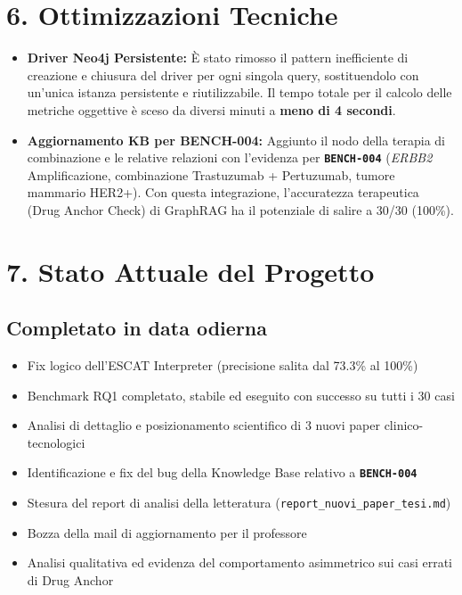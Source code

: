 \documentclass[12pt, a4paper]{article}
\newcommand{\pass}[1]{{\color{passgreen}\textbf{#1}}}
\newcommand{\bench}[1]{{\texttt{\textbf{#1}}}}
\begin{document}
\section*{6. Ottimizzazioni Tecniche}
\begin{itemize}[leftmargin=1.5em, itemsep=3pt]
  \item \textbf{Driver Neo4j Persistente:} È stato rimosso il pattern inefficiente di creazione e chiusura del driver per ogni singola query, sostituendolo con un'unica istanza persistente e riutilizzabile. Il tempo totale per il calcolo delle metriche oggettive è sceso da diversi minuti a \pass{meno di 4 secondi}.
  \item \textbf{Aggiornamento KB per BENCH-004:} Aggiunto il nodo della terapia di combinazione e le relative relazioni con l'evidenza per \bench{BENCH-004} (\textit{ERBB2} Amplificazione, combinazione Trastuzumab + Pertuzumab, tumore mammario HER2+). Con questa integrazione, l'accuratezza terapeutica (Drug Anchor Check) di GraphRAG ha il potenziale di salire a 30/30 (100\%).
\end{itemize}

\section*{7. Stato Attuale del Progetto}

\subsection*{Completato in data odierna}
\begin{itemize}[leftmargin=1.8em, itemsep=2pt, label=\pass{[\textsf{x}]}]
  \item Fix logico dell'ESCAT Interpreter (precisione salita dal 73.3\% al 100\%)
  \item Benchmark RQ1 completato, stabile ed eseguito con successo su tutti i 30 casi
  \item Analisi di dettaglio e posizionamento scientifico di 3 nuovi paper clinico-tecnologici
  \item Identificazione e fix del bug della Knowledge Base relativo a \bench{BENCH-004}
  \item Stesura del report di analisi della letteratura (\texttt{report\_nuovi\_paper\_tesi.md})
  \item Bozza della mail di aggiornamento per il professore
  \item Analisi qualitativa ed evidenza del comportamento asimmetrico sui casi errati di Drug Anchor
\end{itemize}
\end{document}
